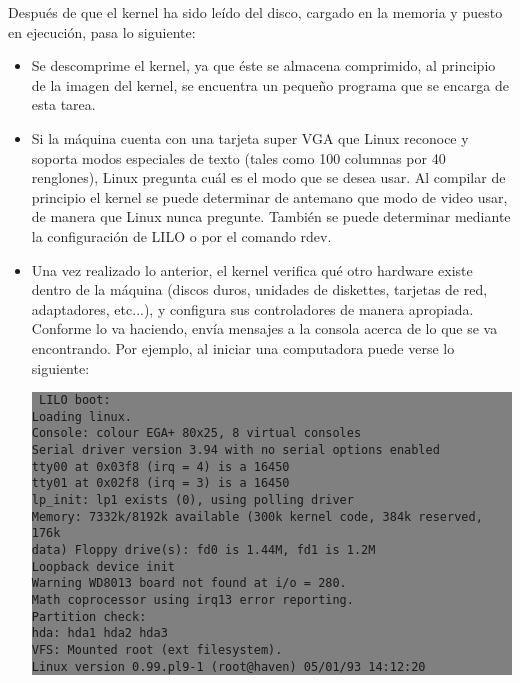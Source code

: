 \documentclass[12pt]{article}
\begin{document}
 Después de que el kernel ha sido leído del disco, cargado en la memoria y
puesto en ejecución, pasa lo siguiente: \begin{itemize}

	\item{

Se descomprime el kernel, ya que éste se almacena comprimido, al principio de la
imagen del kernel, se encuentra un pequeño programa que se encarga de esta
tarea.  }

	\item{

Si la máquina cuenta con una tarjeta super VGA que Linux reconoce y soporta
modos especiales de texto (tales como 100 columnas por 40 renglones), Linux
pregunta cuál es el modo que se desea usar. Al compilar de principio el kernel
se puede determinar de antemano que modo de video usar, de manera que Linux
nunca pregunte. También se puede determinar mediante la configuración de LILO o
por el comando rdev.  }

	\item{

Una vez realizado lo anterior, el kernel verifica qué otro hardware existe
dentro de la máquina (discos duros, unidades de diskettes, tarjetas de red,
adaptadores, etc...), y configura sus controladores de manera apropiada.
Conforme lo va haciendo, envía mensajes a la consola acerca de lo que se va
encontrando. Por ejemplo, al iniciar una computadora puede verse lo siguiente:

  
   


\colorbox{grey}{\parbox[t]{0.95\linewidth}{ \vspace*{0.5cm} {\tt 
LILO boot: \\
Loading linux. \\
Console: colour EGA+ 80x25, 8 virtual consoles \\
Serial driver version 3.94 with no serial options enabled \\
tty00 at 0x03f8 (irq = 4) is a 16450 \\
tty01 at 0x02f8 (irq = 3) is a 16450 \\
lp\_init: lp1 exists (0), using polling driver \\
Memory: 7332k/8192k available (300k kernel code, 384k reserved, 176k \\
data)
Floppy drive(s): fd0 is 1.44M, fd1 is 1.2M \\
Loopback device init \\
Warning WD8013 board not found at i/o = 280. \\
Math coprocessor using irq13 error reporting. \\
Partition check: \\
  hda: hda1 hda2 hda3 \\
VFS: Mounted root (ext filesystem). \\
Linux version 0.99.pl9-1 (root@haven) 05/01/93 14:12:20
 } \vspace*{0.5cm} } } 




}
\end{itemize}
\end{document}
